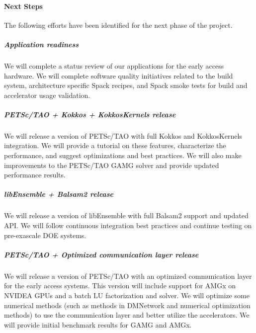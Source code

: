 \paragraph{Next Steps}
The following efforts have been identified for the next phase of the project.


  \subparagraph{Application readiness} 
  We will complete a status review of our applications for the early access hardware.  We will 
  complete software quality initiatives related to the build system, architecture specific Spack 
  recipes, and Spack smoke tests for build and accelerator usage validation.
  \subparagraph{PETSc/TAO + Kokkos + KokkosKernels release}
  We will release a version of PETSc/TAO with full Kokkos and KokkosKernels integration.  We will 
  provide a tutorial on these features, characterize the performance, and suggest optimizations 
  and best practices.  
  We will also make improvements to the PETSc/TAO GAMG solver and provide updated performance results.
  \subparagraph{libEnsemble + Balsam2 release}
  We will release a version of libEnsemble with full Balsam2 support and updated API.
  We will follow continuous integration best practices and continue testing on pre-exascale DOE systems.
  \subparagraph{PETSc/TAO + Optimized communication layer release}
  We will release a version of PETSc/TAO with an optimized communication layer for the early access systems.  
  This version will include support for AMGx on NVIDEA GPUs and a batch LU factorization and solver.
  We will optimize some numerical methods (such as methods in DMNetwork and numerical optimization methods) 
  to use the communication layer and better utilize the accelerators.
  We will provide initial benchmark results for GAMG and AMGx.


